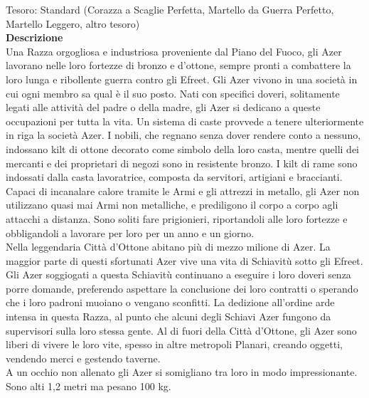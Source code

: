 \begin{multicols}{2}
Tesoro: Standard (Corazza a Scaglie Perfetta, Martello da Guerra Perfetto, Martello Leggero, altro tesoro)\\
\textbf{Descrizione}\\
Una Razza orgogliosa e industriosa proveniente dal Piano del Fuoco, gli Azer lavorano nelle loro fortezze di bronzo e d’ottone, sempre pronti a combattere la loro lunga e ribollente guerra contro gli Efreet. Gli Azer vivono in una società in cui ogni membro sa qual è il suo posto. Nati con specifici doveri, solitamente legati alle attività del padre o della madre, gli Azer si dedicano a queste occupazioni per tutta la vita. Un sistema di caste provvede a tenere ulteriormente in riga la società Azer. I nobili, che regnano senza dover rendere conto a nessuno, indossano kilt di ottone decorato come simbolo della loro casta, mentre quelli dei mercanti e dei proprietari di negozi sono in resistente bronzo. I kilt di rame sono indossati dalla casta lavoratrice, composta da servitori, artigiani e braccianti.\\
Capaci di incanalare calore tramite le Armi e gli attrezzi in metallo, gli Azer non utilizzano quasi mai Armi non metalliche, e prediligono il corpo a corpo agli attacchi a distanza. Sono soliti fare prigionieri, riportandoli alle loro fortezze e obbligandoli a lavorare per loro per un anno e un giorno.\\
Nella leggendaria Città d'Ottone abitano più di mezzo milione di Azer. La maggior parte di questi sfortunati Azer vive una vita di Schiavitù sotto gli Efreet. Gli Azer soggiogati a questa Schiavitù continuano a eseguire i loro doveri senza porre domande, preferendo aspettare la conclusione dei loro contratti o sperando che i loro padroni muoiano o vengano sconfitti. La dedizione all’ordine arde intensa in questa Razza, al punto che alcuni degli Schiavi Azer fungono da supervisori sulla loro stessa gente. Al di fuori della Città d'Ottone, gli Azer sono liberi di vivere le loro vite, spesso in altre metropoli Planari, creando oggetti, vendendo merci e gestendo taverne.\\
A un occhio non allenato gli Azer si somigliano tra loro in modo impressionante. Sono alti 1,2 metri ma pesano 100 kg.\\


\end{multicols}
